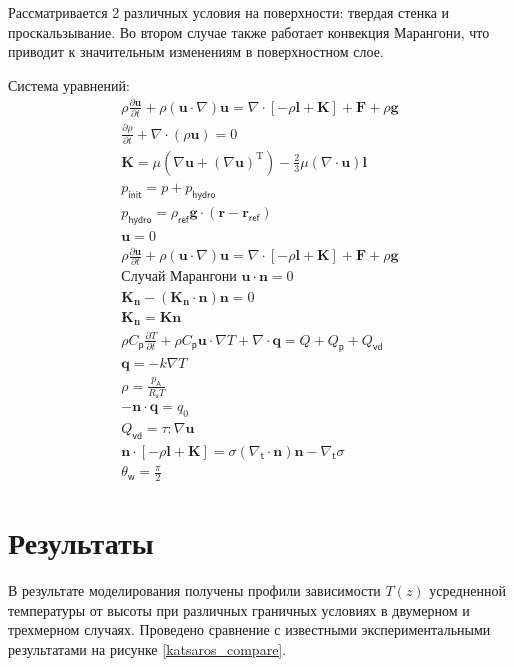 \documentclass[a4paper, 14pt]{extarticle}
\begin{document}
Рассматривается 2 различных условия на поверхности: твердая стенка и проскальзывание. Во втором случае также работает конвекция Марангони, что приводит к значительным изменениям в поверхностном слое.

Система уравнений:
	\begin{eqnarray}
		\rho\frac{\partial \mathbf{u}}{\partial t} + \rho(\mathbf{u}\cdot\nabla)\mathbf{u} = \nabla\cdot[-\rho\mathbf{l}+\mathbf{K}] + \mathbf{F} + \rho\mathbf{g} \\
		\frac{\partial\rho}{\partial t} + \nabla\cdot(\rho\mathbf{u})=0 \\
		\mathbf{K}=\mu(\nabla\mathbf{u}+(\nabla\mathbf{u})^\mathrm{T}) - \frac{2}{3}\mu(\nabla\cdot\mathbf{u})\mathbf{l} \\
		p_\mathsf{init}=p+p_\mathsf{hydro} \\
		p_\mathsf{hydro} = \rho_\mathsf{ref}\mathbf{g}\cdot(\mathbf{r}-\mathbf{r}_\mathsf{ref}) \\
		\mathbf{u}=0 \\
		\rho\frac{\partial\mathbf{u}}{\partial t}+\rho (\mathbf{u}\cdot\nabla)\mathbf{u} = \nabla\cdot[-\rho\mathbf{l}+\mathbf{K}] + \mathbf{F} + \rho\mathbf{g} \\
		\text{Случай Марангони } \mathbf{u}\cdot\mathbf{n}=0 \\
		\mathbf{K_n}-(\mathbf{K_n}\cdot\mathbf{n})\mathbf{n}=0 \\ \mathbf{K_n}=\mathbf{Kn} \\
		\rho C_\mathsf{p} \frac{\partial T}{\partial t} + \rho C_\mathsf{p} \mathbf{u}\cdot\nabla T + \nabla\cdot\mathbf{q}=Q+Q_\mathsf{p}+Q_\mathsf{vd} \\
		\mathbf{q}=-k\nabla T \\
		\rho=\frac{p_\mathsf{A}}{R_\mathsf{s} T} \\
		-\mathbf{n}\cdot\mathbf{q}=q_0 \\
		Q_\mathsf{vd}=\tau : \nabla\mathbf{u} \\
		\mathbf{n}\cdot[-\rho\mathbf{l}+\mathbf{K}]=\sigma(\nabla_\mathsf{t}\cdot\mathbf{n})\mathbf{n}-\nabla_\mathsf{t}\sigma \\
		\theta_\mathsf{w}=\frac{\pi}{2}
	\end{eqnarray}

\section{Результаты}

В результате моделирования получены профили зависимости $T(z)$ усредненной температуры от высоты при различных граничных условиях в двумерном и трехмерном случаях. Проведено сравнение с известными экспериментальными результатами \cite{katsaros1977heat} на рисунке \ref{katsaros_compare}.
\end{document}
